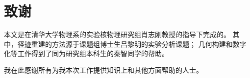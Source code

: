 \chapter*{致谢}
本文是在清华大学物理系的实验核物理研究组肖志刚教授的指导下完成的。
其中，径迹重建的方法源于课题组博士生吕黎明的实验分析课题；
几何构建和数字化等工作得到了同为研究组本科生的秦智同学的帮助。

我在此感谢所有为我本次工作提供知识上和其他方面帮助的人士。
\cleardoublepage
